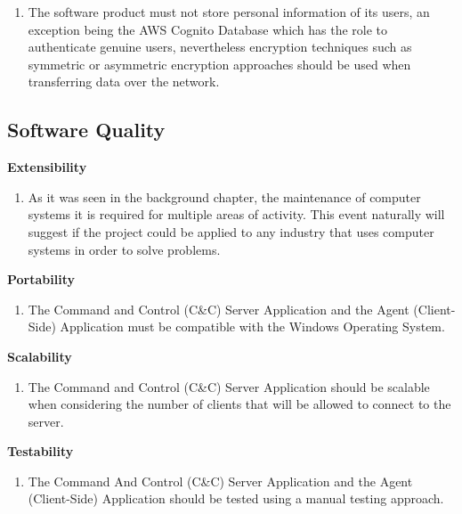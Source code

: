 \begin{enumerate}
    \item The software product must not store personal information of its users, an exception being the
          AWS Cognito Database which has the role to authenticate genuine users, nevertheless encryption
          techniques such as symmetric or asymmetric encryption approaches should be used when
          transferring data over the network.
\end{enumerate}

\subsection{Software Quality}

\noindent
\textbf{Extensibility}

\begin{enumerate}
    \item As it was seen in the background chapter, the maintenance of computer systems it is required for
          multiple areas of activity. This event naturally will suggest if the project could be applied to
          any industry that uses computer systems in order to solve problems.
\end{enumerate}

\noindent
\textbf{Portability}

\begin{enumerate}
    \item The Command and Control (C\&C) Server Application and the Agent (Client-Side) Application must
          be compatible with the Windows Operating System.
\end{enumerate}

\noindent
\textbf{Scalability}

\begin{enumerate}
    \item The Command and Control (C\&C) Server Application should be scalable when considering the number
          of clients that will be allowed to connect to the server.
\end{enumerate}

\noindent
\textbf{Testability}

\begin{enumerate}
    \item The Command And Control (C\&C) Server Application and the Agent (Client-Side) Application should
          be tested using a manual testing approach.
\end{enumerate}

